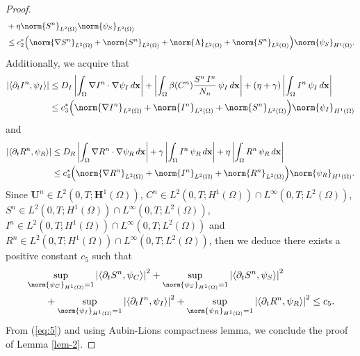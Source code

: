 \documentclass[10pt,number,preprint,times]{elsarticle}
\numberwithin{equation}{section} %
\begin{document}
\begin{proof}
\begin{eqnarray}
\begin{split}
	&+\eta {\norm{S^n}}_{L^2(\Omega)}{\norm{\psi_S}}_{L^2(\Omega)} \\
	&\leq c_2^* \Big({\norm{\nabla S^n}}_{L^2(\Omega)} + {\norm{S^n}}_{L^2(\Omega)} +  {\norm{\Lambda}}_{L^2(\Omega)}  +{\norm{S^n}}_{L^2(\Omega)} \Big){\norm{\psi_S}}_{H^1(\Omega)}.
	\end{split} 
\end{eqnarray}
Additionally, we acquire that
\begin{eqnarray}\label{eq:3}
	\begin{split} 	  		
		\left|\langle\partial_t I^n, \psi_I\rangle\right|&\leq  D_I\left|\int_{\Omega}\nabla I^n \cdot\nabla \psi_I\, d\mathbf{x}\right|+\left|\int_{\Omega}\beta(C^n) \frac{S^n\,I^n}{N_n} \, \psi_I\, d\mathbf{x} \right|+ (\eta+\gamma) \left|\int_{\Omega} I^n \,\psi_I \, d\mathbf{x}\right|
	 \\
	&\leq c_3^* \Big({\norm{\nabla I^n}}_{L^2(\Omega)} + {\norm{I^n}}_{L^2(\Omega)} +{\norm{S^n}}_{L^2(\Omega)} \Big){\norm{\psi_I}}_{H^1(\Omega)}
		\end{split} 
\end{eqnarray}
and
\begin{eqnarray}\label{eq:4}
	\begin{split} 	  		
	\left|\langle\partial_t R^n, \psi_R\rangle\right|&\leq  D_R\left|\int_{\Omega}\nabla R^n \cdot\nabla \psi_R\, d\mathbf{x}\right|+\gamma \left|\int_{\Omega} I^n \,\psi_R \, d\mathbf{x}\right| +\eta \left|\int_{\Omega} R^n \,\psi_R \, d\mathbf{x}\right|
\\
&\leq c_4^* \Big({\norm{\nabla R^n}}_{L^2(\Omega)} + {\norm{I^n}}_{L^2(\Omega)} +{\norm{R^n}}_{L^2(\Omega)} \Big){\norm{\psi_R}}_{H^1(\Omega)}.
	\end{split} 
	\end{eqnarray}
	Since $\boldsymbol{U}^n \in L^2(0,T;\boldsymbol{H}^1(\Omega))$,  $C^n\in L^2(0,T;H^1(\Omega))\cap L^{\infty}(0,T;L^2(\Omega))$,  $S^n\in L^2(0,T;H^1(\Omega))\cap L^{\infty}(0,T;L^2(\Omega))$,  $I^n\in L^2(0,T;H^1(\Omega))\cap L^{\infty}(0,T;L^2(\Omega))$ and $R^n\in L^2(0,T;H^1(\Omega))\cap L^{\infty}(0,T;L^2(\Omega))$, then we  deduce there exists a positive constant $c_5$ such that
\begin{eqnarray}\label{eq:5}
	\begin{split}
	&\sup_{\norm{\psi_C}_{H^1(\Omega)}=1}\left|\langle\partial_t S^n, \psi_C\rangle\right|^2+	\sup_{\norm{\psi_S}_{H^1(\Omega)}=1}\left|\langle\partial_t S^n, \psi_S\rangle\right|^2\\
	&\qquad +	\sup_{\norm{\psi_I}_{H^1(\Omega)}=1}\left|\langle\partial_t I^n, \psi_I\rangle\right|^2+	\sup_{\norm{\psi_R}_{H^1(\Omega)}=1}\left|\langle\partial_t R^n, \psi_R\rangle\right|^2\leq c_5.
\end{split} 
\end{eqnarray}
 From (\ref{eq:5}) and using Aubin-Lions compactness lemma, we conclude the proof of Lemma \ref{lem-2}.
	\end{proof}
	
\end{document}
